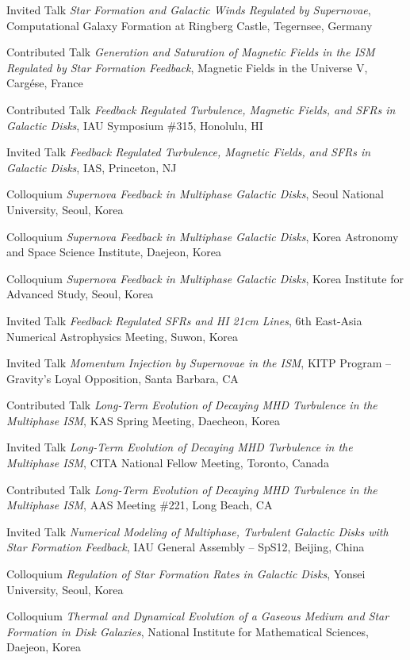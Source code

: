 \documentclass[12pt]{article}
\begin{document}
{Invited Talk}
{\emph{Star Formation and Galactic Winds Regulated by Supernovae},
Computational Galaxy Formation at Ringberg Castle,
Tegernsee, Germany}

{Contributed Talk}
{\emph{Generation and Saturation of Magnetic Fields in the ISM Regulated by Star Formation Feedback},
Magnetic Fields in the Universe V,
Carg\'ese, France}

{Contributed Talk}
{\emph{Feedback Regulated Turbulence, Magnetic Fields, and SFRs in Galactic Disks},
IAU Symposium \#315,
Honolulu, HI}

{Invited Talk}
{\emph{Feedback Regulated Turbulence, Magnetic Fields, and SFRs in Galactic Disks},
IAS,
Princeton, NJ}

{Colloquium}
{\emph{Supernova Feedback in Multiphase Galactic Disks},
Seoul National University,
Seoul, Korea}

{Colloquium}
{\emph{Supernova Feedback in Multiphase Galactic Disks},
Korea Astronomy and Space Science Institute,
Daejeon, Korea}

{Colloquium}
{\emph{Supernova Feedback in Multiphase Galactic Disks},
Korea Institute for Advanced Study,
Seoul, Korea}

{Invited Talk}
{\emph{Feedback Regulated SFRs and HI 21cm Lines},
6th East-Asia Numerical Astrophysics Meeting,
Suwon, Korea}

{Invited Talk}
{\emph{Momentum Injection by Supernovae in the ISM},
KITP Program -- Gravity's Loyal Opposition,
Santa Barbara, CA}

{Contributed Talk}
{\emph{Long-Term Evolution of Decaying MHD Turbulence in the Multiphase ISM},
KAS Spring Meeting,
Daecheon, Korea}

{Invited Talk}
{\emph{Long-Term Evolution of Decaying MHD Turbulence in the Multiphase ISM},
CITA National Fellow Meeting,
Toronto, Canada}

{Contributed Talk}
{\emph{Long-Term Evolution of Decaying MHD Turbulence in the Multiphase ISM},
AAS Meeting \#221,
Long Beach, CA}

{Invited Talk}
{\emph{Numerical Modeling of Multiphase, Turbulent Galactic Disks with Star Formation Feedback},
IAU General Assembly -- SpS12,
Beijing, China}

{Colloquium}
{\emph{Regulation of Star Formation Rates in Galactic Disks},
Yonsei University,
Seoul, Korea}

{Colloquium}
{\emph{Thermal and Dynamical Evolution of a Gaseous Medium and Star Formation in Disk Galaxies},
National Institute for Mathematical Sciences,
Daejeon, Korea}
\end{document}

